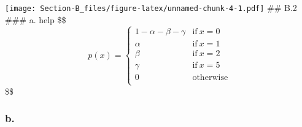 \documentclass[
]{article}
\begin{document}
\texttt{[image: Section-B\_files/figure-latex/unnamed-chunk-4-1.pdf]}
\#\# B.2 \#\#\# a. help \$\$\begin{equation}
    p(x) =
    \left\{
        \begin{array}{cc}
                 1 - \alpha - \beta - \gamma  & \mathrm{if\ } x = 0 \\
                 \alpha   & \mathrm{if\ } x = 1 \\
                  \beta & \mathrm{if\ } x = 2 \\
                  \gamma & \mathrm{if\ } x = 5\\
                  0& \mathrm{otherwise}\\
                  
        \end{array} 
    \right.
\end{equation}\$\$

\hypertarget{b.-1}{%
\subsubsection{b.}\label{b.-1}}
\end{document}
